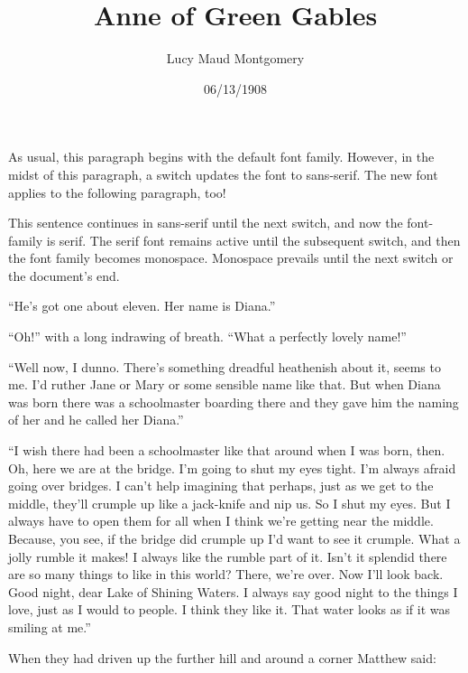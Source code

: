 \documentclass[a4paper]{article}
\title{Anne of Green Gables}
\author{Lucy Maud Montgomery}
\date{06/13/1908}
\begin{document}
\maketitle

As usual, this paragraph begins with the default font family. However, in the midst of this paragraph, \sffamily a switch updates the font to sans-serif. The new font applies to the following paragraph, too!

This sentence continues in sans-serif until \rmfamily the next switch, and now the font-family is serif. The serif font remains active until \ttfamily the subsequent switch, and then the font family becomes monospace. Monospace prevails until the next switch or the document's end.

\sffamily ``He's got one about eleven. Her name is Diana.''

``Oh!'' with a long indrawing of breath. ``What a perfectly lovely name!''

\rmfamily ``Well now, I dunno. There's something dreadful heathenish about it, seems to me. I'd ruther Jane or Mary or some sensible name like that. But when Diana was born there was a schoolmaster boarding there and they gave him the naming of her and he called her Diana.''

``I wish there had been a schoolmaster like that around when I was born, then. Oh, here we are at the bridge. I'm going to shut my eyes tight. I'm always afraid going over bridges. I can't help imagining that perhaps, just as we get to the middle, they'll crumple up like a jack-knife and nip us. So I shut my eyes. But I always have to open them for all when I think we're getting near the middle. Because, you see, if the bridge did crumple up I'd want to see it crumple. What a jolly rumble it makes! I always like the rumble part of it. Isn't it splendid there are so many things to like in this world? There, we're over. Now I'll look back. Good night, dear Lake of Shining Waters. I always say good night to the things I love, just as I would to people. I think they like it. That water looks as if it was smiling at me.''

\ttfamily When they had driven up the further hill and around a corner Matthew said:
\end{document}
